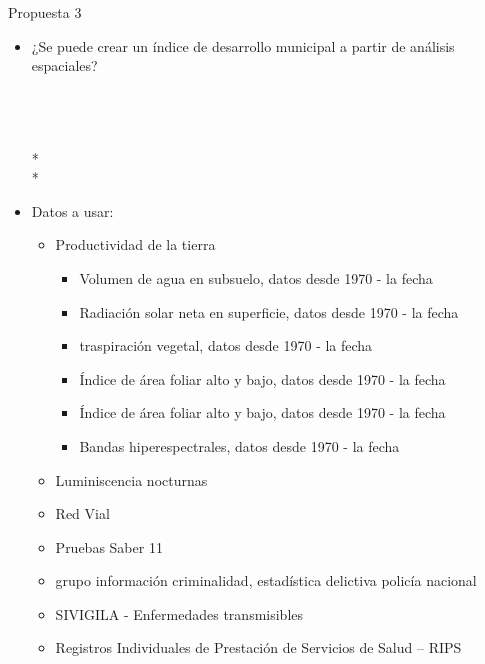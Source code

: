 \documentclass[9pt]{beamer}
\begin{document}
\begin{frame}{Propuesta 3}
\begin{itemize}
\item[] ¿Se puede crear un índice de desarrollo municipal a partir de análisis espaciales?

\\~\\
\\*
\\*
\end{itemize}
\begin{itemize}
\item [] Datos a usar:
\begin{itemize}
\item Productividad de la tierra
     \begin{itemize}
        \item Volumen de agua en subsuelo, datos desde 1970 - la fecha
        \item Radiación solar neta en superficie, datos desde 1970 - la fecha
        \item traspiración vegetal, datos desde 1970 - la fecha
        \item Índice de área foliar alto y bajo, datos desde 1970 - la fecha
        \item Índice de área foliar alto y bajo, datos desde 1970 - la fecha
        \item Bandas hiperespectrales, datos desde 1970 - la fecha
    \end{itemize}
\item Luminiscencia nocturnas
\item Red Vial
\item Pruebas Saber 11
\item grupo información criminalidad,  estadística delictiva policía nacional
\item SIVIGILA - Enfermedades transmisibles
\item Registros Individuales de Prestación de Servicios de Salud – RIPS
\end{itemize}
\end{itemize}
\end{frame}
\end{document}
